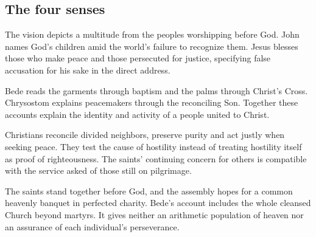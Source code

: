 \subsection{The four senses}
\begin{fourSenses}
\item[Literal.] The vision depicts a multitude from the peoples worshipping before God. John names God's children amid the world's failure to recognize them. Jesus blesses those who make peace and those persecuted for justice, specifying false accusation for his sake in the direct address.
\item[Allegorical.] Bede reads the garments through baptism and the palms through Christ's Cross. Chrysostom explains peacemakers through the reconciling Son. Together these accounts explain the identity and activity of a people united to Christ.
\item[Moral.] Christians reconcile divided neighbors, preserve purity and act justly when seeking peace. They test the cause of hostility instead of treating hostility itself as proof of righteousness. The saints' continuing concern for others is compatible with the service asked of those still on pilgrimage.
\item[Anagogical.] The saints stand together before God, and the assembly hopes for a common heavenly banquet in perfected charity. Bede's account includes the whole cleansed Church beyond martyrs. It gives neither an arithmetic population of heaven nor an assurance of each individual's perseverance.
\end{fourSenses}
